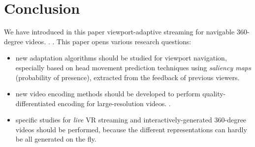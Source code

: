 \section{Conclusion}
\label{sec:conclusion}

We have introduced in this paper viewport-adaptive streaming for
navigable 360-degree videos. .
. This
paper opens various research questions:
\begin{itemize}
  \item new adaptation algorithms should be studied for viewport navigation,
especially based on head movement prediction techniques using \emph{saliency maps} (probability of
presence), extracted from the feedback of
previous viewers.

  \item new video encoding methods should be
developed to perform quality-differentiated encoding for
large-resolution videos. .
\item specific studies for \emph{live} \ac{VR} streaming
and interactively-generated 360-degree videos should be performed,
because the different representations can hardly be all
generated on the fly.
\end{itemize}
